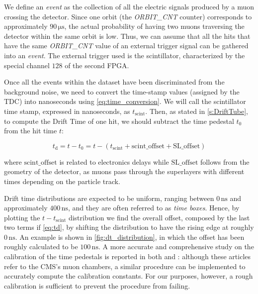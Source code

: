 We define an \textit{event} as the collection of all the electric signals produced by a muon crossing the detector.
Since one orbit (the \textit{ORBIT\_CNT} counter) corresponds to approximately $90\,\si{\us}$, the actual probability of
having two muons traversing the detector within the same orbit is low. Thus, we can assume that all the hits that have
the same \textit{ORBIT\_CNT} value of an external trigger signal can be gathered into an \textit{event}. The external
trigger used is the scintillator, characterized by the special channel $128$ of the second FPGA. 

Once all the events within the dataset have been discriminated from the background noise, we need to convert the
time-stamp values (assigned by the TDC) into nanoseconds using \autoref{eq:time_conversion}. We will call the
scintillator time stamp, expressed in nanoseconds, as $t_{\text{scint}}$. Then, as stated in \autoref{s:DriftTube}, to
compute the Drift Time of one hit, we should subtract the time pedestal $t_{0}$ from the hit time $t$:

\begin{equation}\label{eq:td}
    t_{\text{d}}=t-t_{0}=t-(t_{\text{scint}}+\text{scint\_offset}+\text{SL\_offset})
\end{equation}

\noindent where $\text{scint\_offset}$ is related to electronics delays while $\text{SL\_offset}$ follows from the
geometry of the detector, as muons pass through the superlayers with different times depending on the particle track.

Drift time distributions are expected to be uniform, ranging between $0\,\si{\nano\second}$ and approximately
$400\,\si{\nano\second}$, and they are often referred to as \textit{time boxes}. Hence, by plotting the
$t-t_{\text{scint}}$ distribution we find the overall offset, composed by the last two terms if \autoref{eq:td}, by
shifting the distribution to have the rising edge at roughly $0\,\si{\nano\second}$. An example is shown in
\autoref{fig:dt_distribution}, in which the offset has been roughly calculated to be $100\,\si{\nano\second}$. A more
accurate and comprehensive study on the calibration of the time pedestals is reported in both \cite{amapane} and
\cite{cmscolab}: although these articles refer to the CMS's muon chambers, a similar procedure can be implemented to
accurately compute the calibration constants. For our purposes, however, a rough calibration is sufficient to prevent
the procedure from failing.

